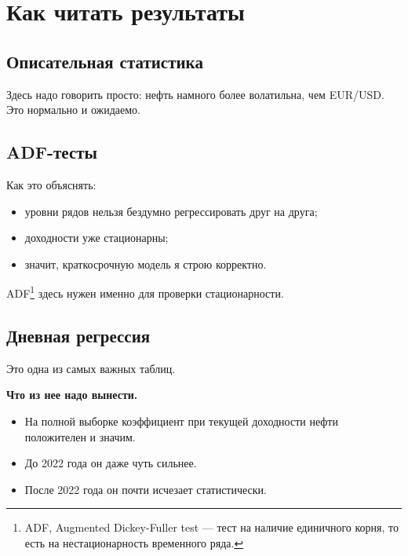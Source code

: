 \documentclass[a4paper,12pt]{article}
\begin{document}
\section{Как читать результаты}

\subsection{Описательная статистика}
\begin{center}

\end{center}

Здесь надо говорить просто: нефть намного более волатильна, чем EUR/USD. Это нормально и ожидаемо.

\subsection{ADF-тесты}
\begin{center}

\end{center}

Как это объяснять:
\begin{itemize}
    \item уровни рядов нельзя бездумно регрессировать друг на друга;
    \item доходности уже стационарны;
    \item значит, краткосрочную модель я строю корректно.
\end{itemize}

ADF\footnote{ADF, Augmented Dickey-Fuller test --- тест на наличие единичного корня, то есть на нестационарность временного ряда.} здесь нужен именно для проверки стационарности.

\subsection{Дневная регрессия}
\begin{center}
\resizebox{\textwidth}{!}{}
\end{center}

Это одна из самых важных таблиц.

\textbf{Что из нее надо вынести.}
\begin{itemize}
    \item На полной выборке коэффициент при текущей доходности нефти положителен и значим.
    \item До 2022 года он даже чуть сильнее.
    \item После 2022 года он почти исчезает статистически.
\end{itemize}
\end{document}
